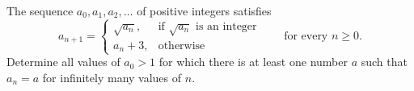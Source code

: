 The sequence $a_0, a_1, a_2, \ldots$ of positive integers satisfies
\[
a_{n+1} = \begin{cases} \sqrt{a_n}, & \text{if } \sqrt{a_n} \text{ is an integer} \\ a_n + 3, & \text{otherwise} \end{cases} \qquad \text{for every } n \geq 0.
\]
Determine all values of $a_0 > 1$ for which there is at least one number $a$ such that $a_n = a$ for infinitely many values of $n$.
